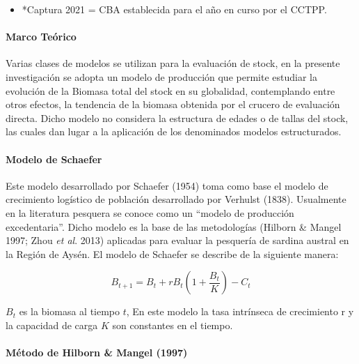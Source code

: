 \documentclass[
  spanish,
]{article}
\providecommand{\tightlist}{%
  \setlength{\itemsep}{0pt}\setlength{\parskip}{0pt}}
\begin{document}
\begin{itemize}
\tightlist
\item
  *Captura 2021 = CBA establecida para el año en curso por el CCTPP.
\end{itemize}

\hypertarget{marco-teuxf3rico}{%
\paragraph{Marco Teórico}\label{marco-teuxf3rico}}

\quad

Varias clases de modelos se utilizan para la evaluación de stock, en la
presente investigación se adopta un modelo de producción que permite
estudiar la evolución de la Biomasa total del stock en su globalidad,
contemplando entre otros efectos, la tendencia de la biomasa obtenida
por el crucero de evaluación directa. Dicho modelo no considera la
estructura de edades o de tallas del stock, las cuales dan lugar a la
aplicación de los denominados modelos estructurados.

\hypertarget{modelo-de-schaefer}{%
\paragraph{Modelo de Schaefer}\label{modelo-de-schaefer}}

\quad

Este modelo desarrollado por Schaefer (1954) toma como base el modelo de
crecimiento logístico de población desarrollado por Verhulst (1838).
Usualmente en la literatura pesquera se conoce como un ``modelo de
producción excedentaria''. Dicho modelo es la base de las metodologías
(Hilborn \& Mangel 1997; Zhou \emph{et al}. 2013) aplicadas para evaluar
la pesquería de sardina austral en la Región de Aysén. El modelo de
Schaefer se describe de la siguiente manera:

\vspace{0.5cm}
\begin{equation}
B_{t+1}=B_t + rB_t \left({1+\displaystyle\frac{B_t}{K}}\right)-C_t
\end{equation} 
\vspace{0.5cm}

\(B_t\) es la biomasa al tiempo \(t\), En este modelo la tasa intrínseca
de crecimiento r y la capacidad de carga \(K\) son constantes en el
tiempo.

\hypertarget{muxe9todo-de-hilborn-mangel-1997}{%
\paragraph{Método de Hilborn \& Mangel
(1997)}\label{muxe9todo-de-hilborn-mangel-1997}}
\end{document}
